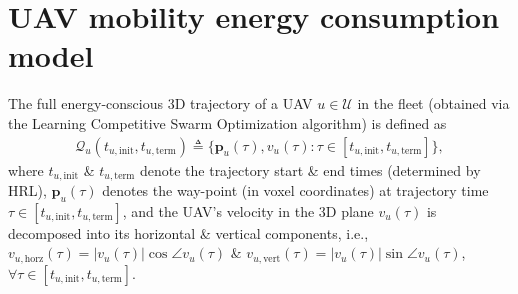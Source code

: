 \documentclass{article}
\begin{document}
\section{UAV mobility energy consumption model}
The full energy-conscious $3$D trajectory of a UAV $u{\in}\mathcal{U}$ in the fleet (obtained via the Learning Competitive Swarm Optimization algorithm) is defined as
\begin{align}\label{3D_trajectory}
    \mathcal{Q}_{u}\left(t_{u,\mathrm{init}},t_{u,\mathrm{term}}\right){\triangleq}\Big\{\mathbf{p}_{u}(\tau),v_{u}(\tau): \tau{\in}\left[t_{u,\mathrm{init}},t_{u,\mathrm{term}}\right]\Big\},    
\end{align}
where $t_{u,\mathrm{init}}$ \& $t_{u,\mathrm{term}}$ denote the trajectory start \& end times (determined by HRL), $\mathbf{p}_{u}(\tau)$ denotes the way-point (in voxel coordinates) at trajectory time $\tau{\in}\left[t_{u,\mathrm{init}},t_{u,\mathrm{term}}\right]$, and the UAV's velocity in the $3$D plane $v_{u}(\tau)$ is decomposed into its horizontal \& vertical components, i.e., $v_{u,\mathrm{horz}}(\tau){=}|v_{u}(\tau)|\cos{\angle{v_{u}(\tau)}}$ \& $v_{u,\mathrm{vert}}(\tau){=}|v_{u}(\tau)|\sin{\angle{v_{u}(\tau)}}$, ${\forall}\tau{\in}\left[t_{u,\mathrm{init}},t_{u,\mathrm{term}}\right]$.
\end{document}
